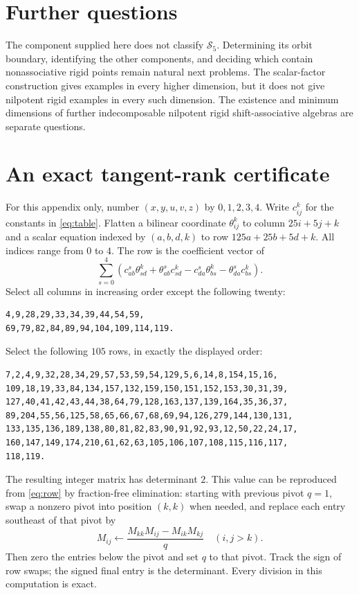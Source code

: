 \documentclass[11pt]{article}
\theoremstyle{remark}
\newcommand{\SAs}{\mathcal S}
\begin{document}
\section{Further questions}
The component supplied here does not classify $\SAs_5$. Determining its orbit boundary, identifying the other components, and deciding which contain nonassociative rigid points remain natural next problems. The scalar-factor construction gives examples in every higher dimension, but it does not give nilpotent rigid examples in every such dimension. The existence and minimum dimensions of further indecomposable nilpotent rigid shift-associative algebras are separate questions.

\appendix
\section{An exact tangent-rank certificate}\label{app:cert}
For this appendix only, number $(x,y,u,v,z)$ by $0,1,2,3,4$. Write $c_{ij}^k$ for the constants in \eqref{eq:table}. Flatten a bilinear coordinate $\theta_{ij}^k$ to column $25i+5j+k$ and a scalar equation indexed by $(a,b,d,k)$ to row $125a+25b+5d+k$. All indices range from $0$ to $4$. The row is the coefficient vector of
\begin{equation}\label{eq:row}
 \sum_{s=0}^4\left(c_{ab}^s\theta_{sd}^k+\theta_{ab}^s c_{sd}^k
 -c_{da}^s\theta_{bs}^k-\theta_{da}^s c_{bs}^k\right).
\end{equation}
Select all columns in increasing order except the following twenty:
\begin{verbatim}
4,9,28,29,33,34,39,44,54,59,
69,79,82,84,89,94,104,109,114,119.
\end{verbatim}
Select the following $105$ rows, in exactly the displayed order:
\begin{verbatim}
7,2,4,9,32,28,34,29,57,53,59,54,129,5,6,14,8,154,15,16,
109,18,19,33,84,134,157,132,159,150,151,152,153,30,31,39,
127,40,41,42,43,44,38,64,79,128,163,137,139,164,35,36,37,
89,204,55,56,125,58,65,66,67,68,69,94,126,279,144,130,131,
133,135,136,189,138,80,81,82,83,90,91,92,93,12,50,22,24,17,
160,147,149,174,210,61,62,63,105,106,107,108,115,116,117,
118,119.
\end{verbatim}
The resulting integer matrix has determinant $2$. This value can be reproduced from \eqref{eq:row} by fraction-free elimination: starting with previous pivot $q=1$, swap a nonzero pivot into position $(k,k)$ when needed, and replace each entry southeast of that pivot by
\[
 M_{ij}\longleftarrow\frac{M_{kk}M_{ij}-M_{ik}M_{kj}}q\quad(i,j>k).
\]
Then zero the entries below the pivot and set $q$ to that pivot. Track the sign of row swaps; the signed final entry is the determinant. Every division in this computation is exact.
\end{document}
